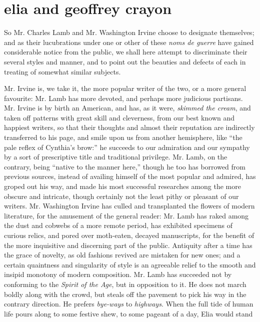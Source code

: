 \chapter[Elia and Geoffrey Crayon]
{elia {\normalsize and} geoffrey crayon}

So Mr. Charles Lamb and Mr. Washington Irvine choose to designate
themselves; and as their lucubrations under one or other of these
\emph{noms de guerre} have gained considerable notice from the
public, we shall here attempt to discriminate their several styles
and manner, and to point out the beauties and defects of each in
treating of somewhat similar subjects.

Mr. Irvine is, we take it, the more popular writer of the two, or
a more general favourite: Mr. Lamb has more devoted, and perhaps
more judicious partisans. Mr. Irvine is by birth an American, and
has, as it were, \emph{skimmed the cream}, and taken off patterns
with great skill and cleverness, from our best known and happiest
writers, so that their thoughts and almost their reputation are
indirectly transferred to his page, and smile upon us from another
hemisphere, like ``the pale reflex of Cynthia's brow:'' he
succeeds to our admiration and our sympathy by a sort of
prescriptive title and traditional privilege. Mr. Lamb, on the
contrary, being ``native to the manner here,'' though he too has
borrowed from previous sources, instead of availing himself of the
most popular and admired, has groped out his way, and made his
most successful researches among the more obscure and intricate,
though certainly not the least pithy or pleasant of our
writers. Mr. Washington Irvine has culled and transplanted the
flowers of modern literature, for the amusement of the general
reader: Mr. Lamb has raked among the dust and cobwebs of a more
remote period, has exhibited specimens of curious relics, and
pored over moth-eaten, decayed manuscripts, for the benefit of the
more inquisitive and discerning part of the public. Antiquity
after a time has the grace of novelty, as old fashions revived are
mistaken for new ones; and a certain quaintness and singularity of
style is an agreeable relief to the smooth and insipid monotony of
modern composition. Mr. Lamb has succeeded not by conforming to
the \emph{Spirit of the Age}, but in opposition to it. He does not
march boldly along with the crowd, but steals off the pavement to
pick his way in the contrary direction. He prefers \emph{bye-ways}
to \emph{highways}. When the full tide of human life pours along
to some festive shew, to some pageant of a day, Elia would stand
